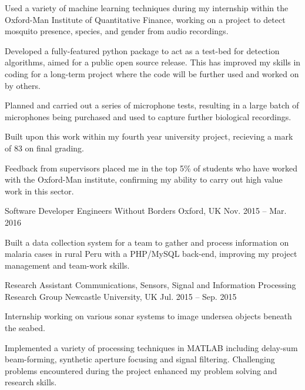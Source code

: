 \begin{cventries}
{\begin{_cvitems}
        \item {Used a variety of machine learning techniques during my internship within the Oxford-Man Institute of Quantitative Finance, working on a project to detect mosquito presence, species, and gender from audio recordings.}
        \item {Developed a fully-featured python package to act as a test-bed for detection algorithms, aimed for a public open source release. This has improved my skills in coding for a long-term project where the code will be further used and worked on by others.}
        \item {Planned and carried out a series of microphone tests, resulting in a large batch of microphones being purchased and used to capture further biological recordings.}
        \item {Built upon this work within my fourth year university project, recieving a mark of 83 on final grading.}
        \item{Feedback from supervisors placed me in the top 5\% of students who have worked with the Oxford-Man institute, confirming my ability to carry out high value work in this sector.}
      \end{_cvitems}
    }
    \cventry
    {Software Developer}
    {Engineers Without Borders}
    {Oxford, UK}
    {Nov. 2015 – Mar. 2016}
    {
      \begin{_cvitems}
        \item {Built a data collection system for a team to gather and process information on malaria cases in rural Peru with a PHP/MySQL back-end, improving my project management and team-work skills.}
      \end{_cvitems}
    }
  \cventry
    {Research Assistant}
    {Communications, Sensors, Signal and Information Processing Research Group}
    {Newcastle University, UK}
    {Jul. 2015 – Sep. 2015}
    {
      \begin{_cvitems}
        \item {Internship working on various sonar systems to image undersea objects beneath the seabed.}
        \item {Implemented a variety of processing techniques in MATLAB including delay-sum beam-forming, synthetic
aperture focusing and signal filtering. Challenging problems encountered during the project enhanced my problem solving and research skills.}
      \end{_cvitems}
    }
\end{cventries}
